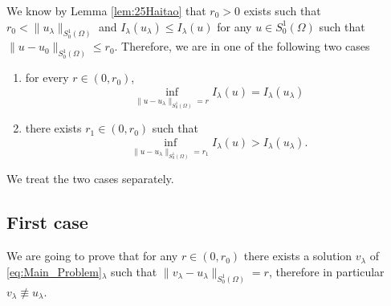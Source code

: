 \documentclass[11pt]{amsart}
\numberwithin{equation}{section} %
\theoremstyle{definition}
\begin{document}
We know by Lemma \ref{lem:25Haitao}
that $r_0>0$ exists such that $r_0<\|u_\lambda\|_{S^1_0(\Omega)}$ and
$I_\lambda(u_\lambda)\leq I_\lambda(u)$ 
for any $u\in S^1_0(\Omega)$ such that $\|u-u_0\|_{S^1_0(\Omega)}\leq r_0$.
Therefore, we are in one of the following two cases
\begin{enumerate}
	\item for every $r\in (0,r_0)$,
	\[
	\inf_{\| u-u_\lambda\|_{S^1_0(\Omega)}=r}I_\lambda(u)=I_\lambda(u_\lambda)
	\]
	\item there exists $r_1\in (0,r_0)$ such that
	\[
	\inf_{\|u-u_\lambda\|_{S^1_0(\Omega)}=r_1}I_\lambda(u)>I_\lambda(u_\lambda).
	\]
\end{enumerate}
We treat the two cases separately.
\subsection{First case} \label{subsec:CaseI}
We are going to prove that for any $r\in (0,r_0)$ there exists
a solution $v_\lambda$ of \eqref{eq:Main_Problem}$_\lambda$ such that
$\|v_\lambda-u_\lambda\|_{S^1_0(\Omega)}=r$, therefore in particular $v_\lambda\not\equiv u_\lambda$.
\end{document}
